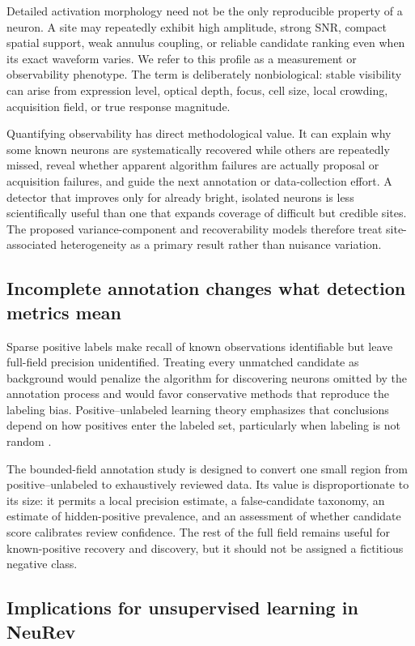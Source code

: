 Detailed activation morphology need not be the only reproducible property of a neuron. A site may repeatedly exhibit high amplitude, strong SNR, compact spatial support, weak annulus coupling, or reliable candidate ranking even when its exact waveform varies. We refer to this profile as a measurement or observability phenotype. The term is deliberately nonbiological: stable visibility can arise from expression level, optical depth, focus, cell size, local crowding, acquisition field, or true response magnitude.

Quantifying observability has direct methodological value. It can explain why some known neurons are systematically recovered while others are repeatedly missed, reveal whether apparent algorithm failures are actually proposal or acquisition failures, and guide the next annotation or data-collection effort. A detector that improves only for already bright, isolated neurons is less scientifically useful than one that expands coverage of difficult but credible sites. The proposed variance-component and recoverability models therefore treat site-associated heterogeneity as a primary result rather than nuisance variation.

\subsection{Incomplete annotation changes what detection metrics mean}

Sparse positive labels make recall of known observations identifiable but leave full-field precision unidentified. Treating every unmatched candidate as background would penalize the algorithm for discovering neurons omitted by the annotation process and would favor conservative methods that reproduce the labeling bias. Positive--unlabeled learning theory emphasizes that conclusions depend on how positives enter the labeled set, particularly when labeling is not random \citep{bekker2020pu}.

The bounded-field annotation study is designed to convert one small region from positive--unlabeled to exhaustively reviewed data. Its value is disproportionate to its size: it permits a local precision estimate, a false-candidate taxonomy, an estimate of hidden-positive prevalence, and an assessment of whether candidate score calibrates review confidence. The rest of the full field remains useful for known-positive recovery and discovery, but it should not be assigned a fictitious negative class.

\subsection{Implications for unsupervised learning in NeuRev}

